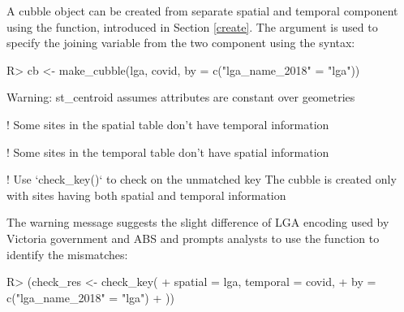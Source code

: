 \documentclass[
  shortnames]{jss}
\begin{document}
A cubble object can be created from separate spatial and temporal component using the  function, introduced in Section \ref{create}. The  argument
is used to specify the joining variable from the two component using the   syntax:

\begin{CodeChunk}
\begin{CodeInput}
R> cb <- make_cubble(lga, covid, by = c("lga_name_2018" = "lga"))
\end{CodeInput}
\begin{CodeOutput}
Warning: st_centroid assumes attributes are constant over geometries
\end{CodeOutput}
\begin{CodeOutput}
! Some sites in the spatial table don't have temporal information
\end{CodeOutput}
\begin{CodeOutput}
! Some sites in the temporal table don't have spatial information
\end{CodeOutput}
\begin{CodeOutput}
! Use `check_key()` to check on the unmatched key
The cubble is created only with sites having both spatial and
temporal information
\end{CodeOutput}
\end{CodeChunk}

The warning message suggests the slight difference of LGA encoding used by Victoria government and ABS and prompts analysts to use the function  to identify the mismatches:

\begin{CodeChunk}
\begin{CodeInput}
R> (check_res <- check_key(
+   spatial = lga, temporal = covid, 
+   by = c("lga_name_2018" = "lga")
+ ))
\end{CodeInput}
\end{CodeChunk}
\end{document}
